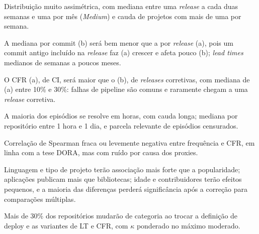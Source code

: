 \begin{description}\setlength{\itemsep}{1pt}
  \item[H1 (RQ01).] Distribuição muito assimétrica, com mediana entre uma \textit{release} a cada duas semanas e
  uma por mês (\textit{Medium}) e cauda de projetos com mais de uma por semana.
  \item[H2 (RQ02).] A mediana por commit (b) será bem menor que a por \textit{release} (a), pois um commit antigo
  incluído na \textit{release} faz (a) crescer e afeta pouco (b); \textit{lead times} medianos de semanas a poucos meses.
  \item[H3 (RQ03).] O CFR (a), de CI, será maior que o (b), de \textit{releases} corretivas, com mediana de (a) entre
  10\% e 30\%: falhas de pipeline são comuns e raramente chegam a uma \textit{release} corretiva.
  \item[H4 (RQ04).] A maioria dos episódios se resolve em horas, com cauda longa; mediana por repositório entre 1 hora
  e 1 dia, e parcela relevante de episódios censurados.
  \item[H5 (RQ05).] Correlação de Spearman fraca ou levemente negativa entre frequência e CFR, em linha com a tese
  DORA, mas com ruído por causa dos proxies.
  \item[H6 (RQ06).] Linguagem e tipo de projeto terão associação mais forte que a popularidade; aplicações publicam
  mais que bibliotecas; idade e contribuidores terão efeitos pequenos, e a maioria das diferenças perderá
  significância após a correção para comparações múltiplas.
  \item[H7 (RQ07).] Mais de 30\% dos repositórios mudarão de categoria ao trocar a definição de deploy e as variantes
  de LT e CFR, com $\kappa$ ponderado no máximo moderado.
\end{description}
